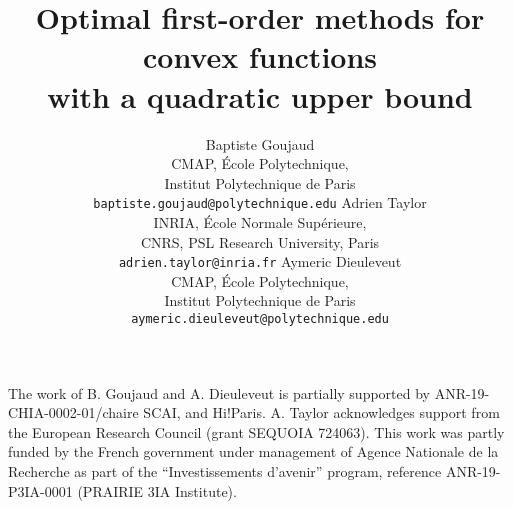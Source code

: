 \documentclass{article}
\title{Optimal first-order methods for convex functions \\ with a quadratic upper bound}
\author{%
    Baptiste Goujaud\\
    CMAP, École Polytechnique, \\ Institut Polytechnique de Paris \\
    \texttt{baptiste.goujaud@polytechnique.edu}
    \And
    Adrien Taylor \\
    INRIA, École Normale Supérieure, \\ CNRS, PSL Research University, Paris \\
    \texttt{adrien.taylor@inria.fr}
    \And
    Aymeric Dieuleveut \\
    CMAP, École Polytechnique, \\ Institut Polytechnique de Paris \\ \texttt{aymeric.dieuleveut@polytechnique.edu}
}
\begin{document}

\maketitle




\begin{ack}
    The work of B. Goujaud and A. Dieuleveut is partially supported by ANR-19-CHIA-0002-01/chaire SCAI, and Hi!Paris. A. Taylor acknowledges support from the European Research Council (grant SEQUOIA 724063). This work was partly funded by the French government under management of Agence Nationale de la Recherche as part of the ``Investissements d’avenir'' program, reference ANR-19-P3IA-0001 (PRAIRIE 3IA Institute).
\end{ack}

% 

% 





\end{document}
